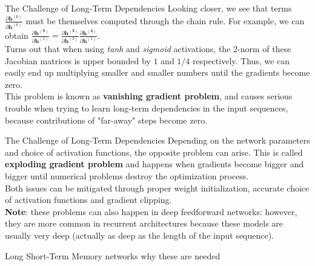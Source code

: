 \documentclass[aspectratio=169]{beamer}
\begin{document}

\begin{frame}{The Challenge of Long-Term Dependencies}
Looking closer, we see that terms $\frac{\partial \bm{h^{(t)}}}{\partial \bm{h}^{(k)}}$ must be themselves computed through the chain rule. For example, we can obtain $\frac{\partial \bm{h^{(3)}}}{\partial \bm{h}^{(1)}} = \frac{\partial \bm{h^{(3)}}}{\partial \bm{h}^{(2)}} \frac{\partial \bm{h^{(2)}}}{\partial \bm{h}^{(1)}}$.\\
\vspace{0.5cm}
Turns out \cite{pascanu2013difficulty} that when using \textit{tanh} and \textit{sigmoid} activations, the 2-norm of these Jacobian matrices is upper bounded by $1$ and $1/4$ respectively. Thus, we can easily end up multiplying smaller and smaller numbers until the gradients become zero.\\
\vspace{0.5cm}
This problem is known as \textbf{vanishing gradient problem}, and causes serious trouble when trying to learn long-term dependencies in the input sequences, because contributions of "far-away" steps become zero.
\end{frame}


\begin{frame}{The Challenge of Long-Term Dependencies}
Depending on the network parameters and choice of activation functions, the opposite problem can arise. This is called \textbf{exploding gradient problem} and happens when gradients become bigger and bigger until numerical problems destroy the optimization process.\\
\vspace{0.5cm}
Both issues can be mitigated through proper weight initialization, accurate choice of activation functions and gradient clipping.\\
\vspace{0.5cm}
\textbf{Note}: these problems can also happen in deep feedforward networks: however, they are more common in recurrent architectures because these models are usually very deep (actually as deep as the length of the input sequence).
\end{frame}


\begin{frame}{Long Short-Term Memory networks}
why these are needed
\end{frame}
\end{document}
